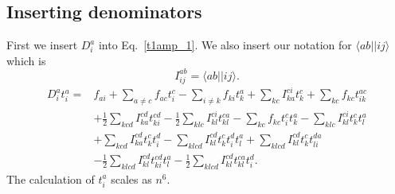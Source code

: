 \documentclass[graybox,sectrefs,envcountresetchap,open=right]{svmonodo}
\begin{document}
\subsection{Inserting denominators}


First we insert $D_i^a$ into Eq.~\ref{t1amp_1}. We also insert our notation for $\langle ab || ij \rangle$ which is
\begin{equation}
I_{ij}^{ab} = \langle ab || ij \rangle .
\end{equation}
\begin{align}
D_i^a t_i^a = & 
f_{ai} 
+ \sum_{a\not= c} f_{ac} t_i^c 
- \sum_{i \not= k} f_{ki} t_k^a 
+ \sum_{kc} I_{ka}^{ci} t_k^c 
+ \sum_{kc} f_{kc} t_{ik}^{ac} \nonumber \\ &
+ \frac{1}{2} \sum_{kcd} I_{ka}^{cd} t_{ki}^{cd} 
- \frac{1}{2} \sum_{klc} I_{kl}^{ci} t_{kl}^{ca} 
- \sum_{kc} f_{kc} t_i^c t_k^a 
- \sum_{klc} I_{kl}^{ci} t_k^c t_l^a \nonumber \\ & 
 + \sum_{kcd} I_{ka}^{cd} t_k^c t_i^d 
- \sum_{klcd} I_{kl}^{cd} t_k^c t_i^d t_l^a 
+ \sum_{klcd} I_{kl}^{cd} t_k^c t_{li}^{da} \nonumber \\ &
 - \frac{1}{2} \sum_{klcd} I_{kl}^{cd} t_{ki}^{cd} t_l^a 
- \frac{1}{2} \sum_{klcd} I_{kl}^{cd} t_{kl}^{ca} t_i^d
. 
\end{align}
The calculation of $t_i^a$ scales as $n^6$.
\end{document}
